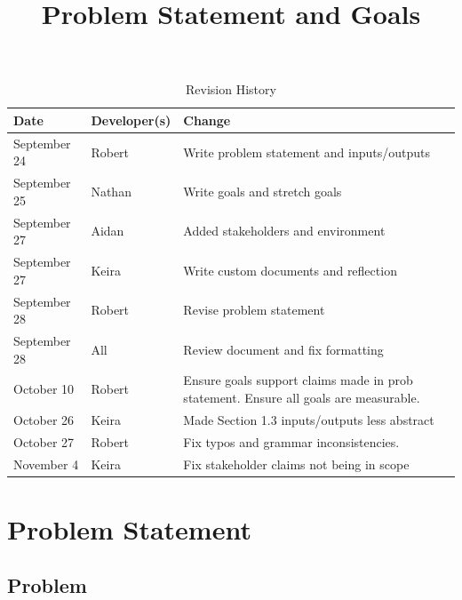 \documentclass{article}
\title{Problem Statement and Goals\\\progname}
\author{\authname}
\date{}
\begin{document}
\maketitle

\begin{table}[hp]
\caption{Revision History}
\label{TblRevisionHistory}
\begin{tabularx}{\textwidth}{llX}
\toprule
\textbf{Date} & \textbf{Developer(s)} & \textbf{Change}\\
\midrule
September 24 & Robert & Write problem statement and inputs/outputs\\
September 25 & Nathan & Write goals and stretch goals\\
September 27 & Aidan & Added stakeholders and environment \\
September 27 & Keira & Write custom documents and reflection \\
September 28 & Robert & Revise problem statement \\
September 28 & All & Review document and fix formatting \\
October 10 & Robert & Ensure goals support claims made in prob statement. Ensure all goals are measurable. \\
October 26 & Keira & Made Section 1.3 inputs/outputs less abstract \\
October 27 & Robert & Fix typos and grammar inconsistencies.\\
November 4 & Keira & Fix stakeholder claims not being in scope \\
\bottomrule
\end{tabularx}
\end{table}


\section{Problem Statement}

\subsection{Problem}
\end{document}
